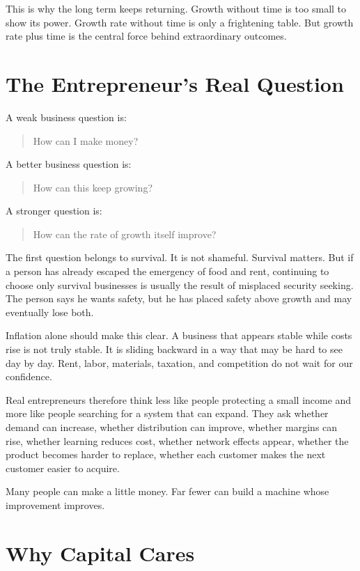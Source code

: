 This is why the long term keeps returning. Growth without time is too small to show its power. Growth rate without time is only a frightening table. But growth rate plus time is the central force behind extraordinary outcomes.

\section*{The Entrepreneur's Real Question}

A weak business question is:

\begin{quote}
How can I make money?
\end{quote}

A better business question is:

\begin{quote}
How can this keep growing?
\end{quote}

A stronger question is:

\begin{quote}
How can the rate of growth itself improve?
\end{quote}

The first question belongs to survival. It is not shameful. Survival matters. But if a person has already escaped the emergency of food and rent, continuing to choose only survival businesses is usually the result of misplaced security seeking. The person says he wants safety, but he has placed safety above growth and may eventually lose both.

Inflation alone should make this clear. A business that appears stable while costs rise is not truly stable. It is sliding backward in a way that may be hard to see day by day. Rent, labor, materials, taxation, and competition do not wait for our confidence.

Real entrepreneurs therefore think less like people protecting a small income and more like people searching for a system that can expand. They ask whether demand can increase, whether distribution can improve, whether margins can rise, whether learning reduces cost, whether network effects appear, whether the product becomes harder to replace, whether each customer makes the next customer easier to acquire.

Many people can make a little money. Far fewer can build a machine whose improvement improves.

\section*{Why Capital Cares}

